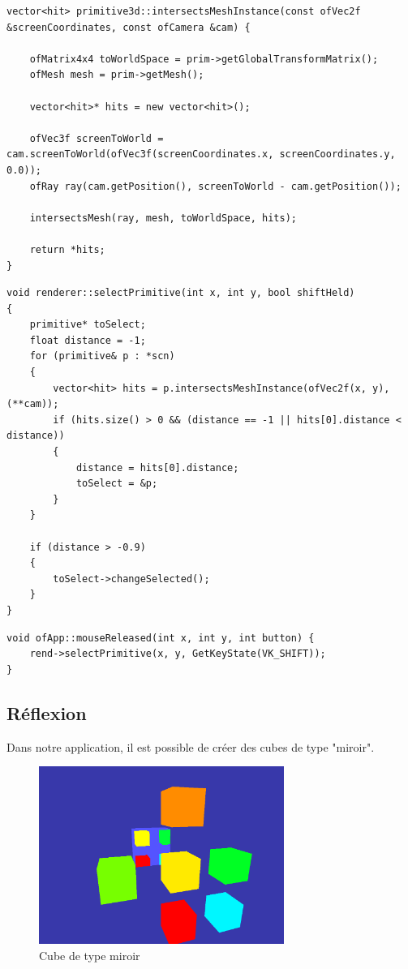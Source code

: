 \begin{lstlisting}
vector<hit> primitive3d::intersectsMeshInstance(const ofVec2f &screenCoordinates, const ofCamera &cam) {

	ofMatrix4x4 toWorldSpace = prim->getGlobalTransformMatrix();
	ofMesh mesh = prim->getMesh();
	
	vector<hit>* hits = new vector<hit>();
	
	ofVec3f screenToWorld = cam.screenToWorld(ofVec3f(screenCoordinates.x, screenCoordinates.y, 0.0));
	ofRay ray(cam.getPosition(), screenToWorld - cam.getPosition());
	
	intersectsMesh(ray, mesh, toWorldSpace, hits);
	
	return *hits;
}
\end{lstlisting}

\begin{lstlisting}
void renderer::selectPrimitive(int x, int y, bool shiftHeld)
{
	primitive* toSelect;
	float distance = -1;
	for (primitive& p : *scn)
	{
		vector<hit> hits = p.intersectsMeshInstance(ofVec2f(x, y), (**cam));
		if (hits.size() > 0 && (distance == -1 || hits[0].distance < distance))
		{
			distance = hits[0].distance;
			toSelect = &p;
		}
	}
	
	if (distance > -0.9)
	{
		toSelect->changeSelected();
	}
}
\end{lstlisting}

\begin{lstlisting}
void ofApp::mouseReleased(int x, int y, int button) {
	rend->selectPrimitive(x, y, GetKeyState(VK_SHIFT));
}
\end{lstlisting}

\subsection{Réflexion}
Dans notre application, il est possible de créer des cubes de type "miroir".

\begin{figure}[h]
	\centering
	\includegraphics[width=8cm]{fig/CubeReflection1.png}
	\caption{Cube de type miroir}
	\label{fig:propriete}
\end{figure}

